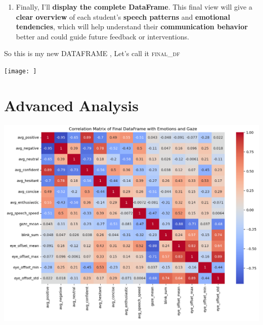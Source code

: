 \documentclass{article}
\newcommand{\highlight}[1]{\textsf{\textbf{#1}}}  %
\begin{document}
\begin{multicols}{2}
\begin{enumerate}
    \item Finally, I’ll \highlight{display the complete DataFrame}. This final view will give a \highlight{clear overview} of each student's \highlight{speech patterns} and \highlight{emotional tendencies}, which will help understand their \highlight{communication behavior} better and could guide future feedback or interventions.
\end{enumerate}

\end{multicols}
\newpage

So this is my new DATAFRAME , Let's call it \textsc{final_df}
\begin{center}
    
\texttt{[image: ]}
\end{center}


\section{Advanced Analysis}
\begin{center}
    \includegraphics[width=1\columnwidth]{images/corr_matrix_of_final_data.png}
    \caption{}
    \label{fig:enter-label}
\end{center}
\end{document}
